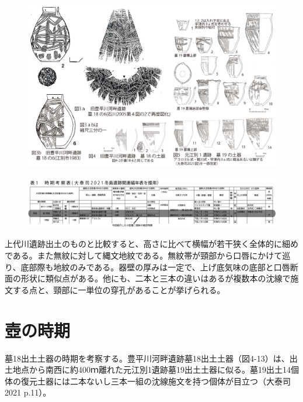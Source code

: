 \documentclass[a4j,11pt,twocolumn,openany]{jsbook}
\begin{document}
\begin{figure}[ht]
	\centering
	\includegraphics[width=160truemm]{fig/03_Otaishi/02_otaishi.jpg}
	\label{}
	\vspace{-1\baselineskip}
\end{figure}

\begin{figure}[ht]
	\centering
	\includegraphics[width=160truemm]{fig/03_Otaishi/03_otaishi.jpg}
	\label{}
	\vspace{-1\baselineskip}
\end{figure}

上代川遺跡出土のものと比較すると、高さに比べて横幅が若干狭く全体的に細めである。また無紋に対して縄文地紋である。無紋帯が頸部から口唇にかけて巡り、底部際も地紋のみである。器壁の厚みは一定で、上げ底気味の底部と口唇断面の形状に類似点がある。他にも、二本と三本の違いはあるが複数本の沈線で施文する点と、頸部に一単位の穿孔があることが挙げられる。

\section{壺の時期}
墓18出土土器の時期を考察する。豊平川河畔遺跡墓18出土土器（図4-13）は、出土地点から南西に約400ｍ離れた元江別1遺跡墓19出土土器に似る。墓19出土14個体の復元土器には二本ないし三本一組の沈線施文を持つ個体が目立つ（大泰司2021 p.11）。
\end{document}
